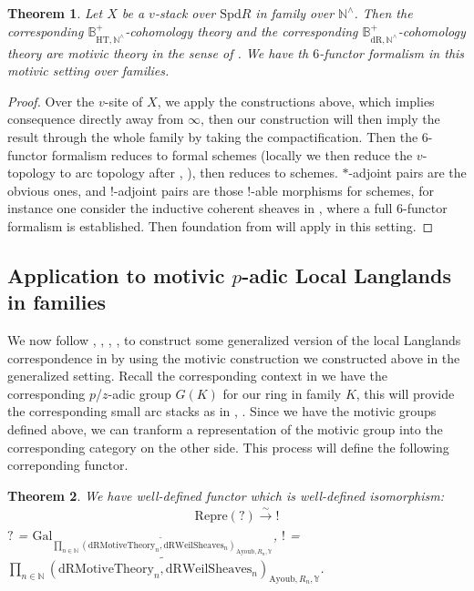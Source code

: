 \documentclass[12pt]{article}
\newtheorem{theorem}{Theorem}
\theoremstyle{definition}
\begin{document}
\begin{theorem}
Let $X$ be a $v$-stack over $\mathrm{Spd}R$ in family over $\mathbb{N}^\wedge$. Then the corresponding $\mathbb{B}_{\mathrm{HT},\mathbb{N}^\wedge}^+$-cohomology theory and the corresponding $\mathbb{B}_{\mathrm{dR},\mathbb{N}^\wedge}^+$-cohomology theory are motivic theory in the sense of \cite{2A}. We have th $6$-functor formalism in this motivic setting over families. 
\end{theorem}

\begin{proof}
Over the $v$-site of $X$, we apply the constructions above, which implies consequence directly away from $\infty$, then our construction will then imply the result through the whole family by taking the compactification. Then the 6-functor formalism reduces to formal schemes (locally we then reduce the $v$-topology to arc topology after \cite{1S5}, \cite{1S6}), then reduces to schemes. $*$-adjoint pairs are the obvious ones, and $!$-adjoint pairs are those $!$-able morphisms for schemes, for instance one consider the inductive coherent sheaves in \cite{GRI}, \cite{GRII} where a full 6-functor formalism is established. Then foundation from \cite{2A} will apply in this setting.
\end{proof}


\subsection{Application to motivic $p$-adic Local Langlands in families} 

\noindent We now follow \cite{1S5}, \cite{1S6}, \cite{L1}, \cite{1FS}, \cite{2LH} to construct some generalized version of the local Langlands correspondence in \cite{1FS} by using the motivic construction we constructed above in the generalized setting. Recall the corresponding context in \cite{2LH} we have the corresponding $p$/$z$-adic group $G(K)$ for our ring in family $K$, this will provide the corresponding small arc stacks as in \cite{1S5}, \cite{1S6}. Since we have the motivic groups defined above, we can tranform a representation of the motivic group into the corresponding category on the other side. This process will define the following correponding functor.


\begin{theorem}
We have well-defined functor which is well-defined isomorphism:
\begin{align}
\mathrm{Repre}(?) \overset{\sim}{\rightarrow}  ! 
\end{align}
$?$ = $\mathrm{Gal}_{\widetilde{\prod_{n\in \mathbb{N}} (\mathrm{dRMotiveTheory}_{n}, \mathrm{dRWeilSheaves}_n)_{\mathrm{Ayoub}, R_n,\mathbb{Y}}}}$, $!$ = $\widetilde{\prod_{n\in \mathbb{N}} (\mathrm{dRMotiveTheory}_{n}, \mathrm{dRWeilSheaves}_n)_{\mathrm{Ayoub}, R_n,\mathbb{Y}}}$.
\end{theorem}
\end{document}
